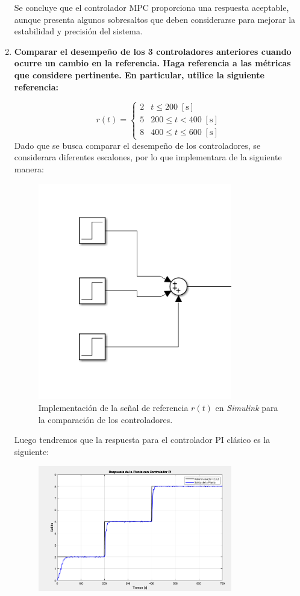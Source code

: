 \begin{enumerate}
    Se concluye que el controlador MPC proporciona una respuesta aceptable, aunque presenta algunos sobresaltos que deben considerarse para mejorar la estabilidad y precisión del sistema.
    \item \textbf{Comparar el desempeño de los 3 controladores anteriores cuando ocurre un cambio en la referencia. Haga referencia a las métricas que considere pertinente. En particular, utilice la siguiente referencia:}

    \[
    r(t) = 
    \begin{cases} 
    2 & t \leq 200 \; [\text{s}] \\ 
    5 & 200 \leq t < 400 \; [\text{s}] \\ 
    8 & 400 \leq t \leq 600 \; [\text{s}]
    \end{cases}
    \]
    Dado que se busca comparar el desempeño de los controladores, se considerara diferentes escalones, por lo que implementara de la siguiente manera:
    \begin{figure}
        \centering
        \includegraphics[width=0.8\textwidth]{img/Figure_13}
        \caption{Implementación de la señal de referencia \(r(t)\) en \textit{Simulink} para la comparación de los controladores.}
        \label{fig:13}
    \end{figure}
    Luego tendremos que la respuesta para el controlador PI clásico es la siguiente:
    \begin{figure}
        \centering
        \includegraphics[width=0.8\textwidth]{img/Figure_14}

\end{figure}
\end{enumerate}
